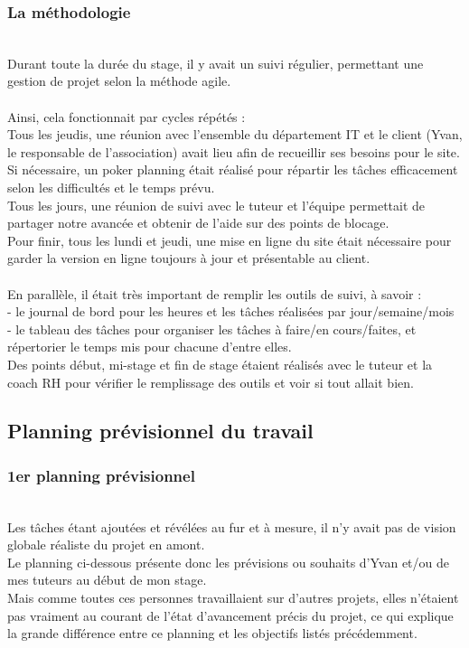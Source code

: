 \subsubsection{La méthodologie}
~\\
Durant toute la durée du stage, il y avait un suivi régulier, permettant une gestion de projet selon la méthode agile.
\\\\
Ainsi, cela fonctionnait par cycles répétés : 
\\
Tous les jeudis, une réunion avec l'ensemble du département IT et le client (Yvan, le responsable de l'association) avait lieu afin de recueillir ses besoins pour le site.\\
Si nécessaire, un poker planning était réalisé pour répartir les tâches efficacement selon les difficultés et le temps prévu. 
\\Tous les jours, une réunion de suivi avec le tuteur et l'équipe permettait de partager notre avancée et obtenir de l'aide sur des points de blocage.
\\Pour finir, tous les lundi et jeudi, une mise en ligne du site était nécessaire pour garder la version en ligne toujours à jour et présentable au client.
\\\\En parallèle, il était très important de remplir les outils de suivi, à savoir : \\
- le journal de bord pour les heures et les tâches réalisées par jour/semaine/mois\\ 
- le tableau des tâches pour organiser les tâches à faire/en cours/faites, et répertorier le temps mis pour chacune d'entre elles.\\

Des points début, mi-stage et fin de stage étaient réalisés avec le tuteur et la coach RH pour vérifier le remplissage des outils et voir si tout allait bien.

\pagebreak
\subsection{Planning prévisionnel du travail}

\subsubsection{1er planning prévisionnel}
~\\

Les tâches étant ajoutées et révélées au fur et à mesure, il n'y avait pas de vision globale réaliste du projet en amont.\\
Le planning ci-dessous présente donc les prévisions ou souhaits d'Yvan et/ou de mes tuteurs au début de mon stage.\\ 
Mais comme toutes ces personnes travaillaient sur d'autres projets, elles n'étaient pas vraiment au courant de l'état d'avancement précis du projet, ce qui explique la grande différence entre ce planning et les objectifs listés précédemment.

